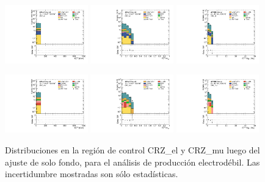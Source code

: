 \begin{figure}[ht!]
  \begin{center}

    \includegraphics[width=0.32\textwidth]{images/analysis_EWK/v192_0_nosyst/can_CRZ_el_met_et_afterFit.pdf}
    \includegraphics[width=0.32\textwidth]{images/analysis_EWK/v192_0_nosyst/can_CRZ_el_met_etmeff_afterFit.pdf}
    \includegraphics[width=0.32\textwidth]{images/analysis_EWK/v192_0_nosyst/can_CRZ_el_met_sig_obj_afterFit.pdf}

    \includegraphics[width=0.32\textwidth]{images/analysis_EWK/v192_0_nosyst/can_CRZ_mu_met_et_afterFit.pdf}
    \includegraphics[width=0.32\textwidth]{images/analysis_EWK/v192_0_nosyst/can_CRZ_mu_met_etmeff_afterFit.pdf}
    \includegraphics[width=0.32\textwidth]{images/analysis_EWK/v192_0_nosyst/can_CRZ_mu_met_sig_obj_afterFit.pdf}

    \caption{Distribuciones en la región de control CRZ\_el y CRZ\_mu luego del ajuste de solo fondo, para el análisis de producción electrodébil. Las incertidumbre mostradas son sólo estadísticas.}
    \label{fig:crz_el_mu_dist_ewk}
  \end{center}
\end{figure}


